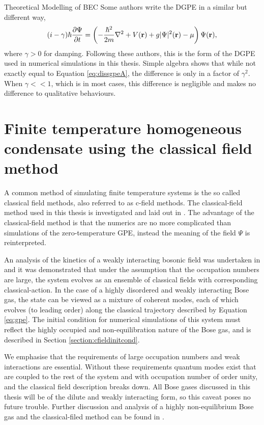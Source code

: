 \begin{chapter}{\label{cha:theoretical_model}Theoretical Modelling of BEC}
	Some authors \cite{tsubota_kasamatsu_02,madarassy_barenghi_08} write the DGPE in a similar but different way,
	\begin{equation}\label{eq:dissgpeB}
		(i-\gamma)\hbar \frac{\partial \Psi}{\partial t} = \left( -\frac{\hbar^2 }{2m}\nabla^2 + V({\bf r}) + g|\Psi|^2({\bf r}) - \mu \right) \Psi({\bf r}),
	\end{equation}
	where $\gamma > 0$ for damping. Following these authors, this is the form of the DGPE used in numerical simulations in this thesis. Simple algebra shows that while not exactly equal to Equation \ref{eq:dissgpeA}, the difference is only in a factor of $\gamma^2$. When $\gamma<<1$, which is in most cases, this difference is negligible and makes no difference to qualitative behaviours.

\section{\label{section:cfield} Finite temperature homogeneous condensate using the classical field method}

A common method of simulating finite temperature systems is the so called classical field methods, also referred to as c-field methods. The classical-field method used in this thesis is investigated and laid out in \cite{PhysRevA.66.013603}. The advantage of the classical-field method is that the numerics are no more complicated than simulations of the zero-temperature GPE, instead the meaning of the field $\Psi$ is reinterpreted.

An analysis of the kinetics of a weakly interacting bosonic field was undertaken in \cite{PhysRev.147.214} and it was demonstrated that under the assumption that the occupation numbers are large, the system evolves as an ensemble of classical fields with corresponding classical-action. In the case of a highly disordered and weakly interacting Bose gas, the state can be viewed as a mixture of coherent modes, each of which evolves (to leading order) along the classical trajectory described by Equation \ref{eq:gpe}. The initial condition for numerical simulations of this system must reflect the highly occupied and non-equilibration nature of the Bose gas, and is described in Section \ref{section:cfieldinitcond}.

We emphasise that the requirements of large occupation numbers and weak interactions are essential. Without these requirements quantum modes exist that are coupled to the rest of the system and with occupation number of order unity, and the classical field description breaks down. All Bose gases discussed in this thesis will be of the dilute and weakly interacting form, so this caveat poses no future trouble. Further discussion and analysis of a highly non-equilibrium Bose gas and the classical-filed method can be found in \cite{PhysRevA.66.013603}.


\end{chapter}
